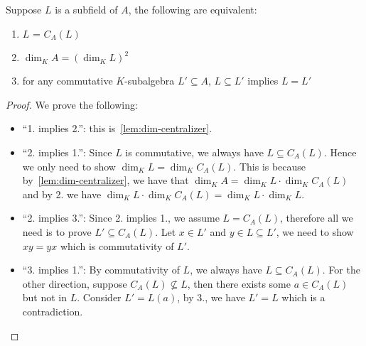 \begin{lemma}\label{lem:tfae-subfield}
  Suppose $L$ is a subfield of $A$, the following are equivalent:
  \begin{enumerate}
    \item $L$ = $C_{A}(L)$
    \item $\dim_{K}A = {\left(\dim_{K}L\right)}^{2}$
    \item for any commutative $K$-subalgebra $L' \subseteq A$, $L \subseteq L'$ implies $L = L'$
  \end{enumerate}
  \leanok
\end{lemma}
\begin{proof}
  We prove the following:
  \begin{itemize}
    \item ``1. implies 2.'': this is~\cref{lem:dim-centralizer}.
    \item ``2. implies 1.'': Since $L$ is commutative, we always have $L \subseteq C_{A}(L)$. Hence we only need to show $\dim_{K}L = \dim_{K}C_{A}(L)$. This is because by~\cref{lem:dim-centralizer}, we have that $\dim_{K}A = \dim_{K}L\cdot \dim_{K}C_{A}(L)$ and by 2. we have $\dim_{K}L\cdot \dim_{K}C_{A}(L)= \dim_{K}L\cdot \dim_{K}L$.
    \item ``2. implies 3.'': Since 2. implies 1., we assume $L = C_{A}(L)$, therefore all we need is to prove $L' \subseteq C_{A}(L)$. Let $x \in L'$ and $y \in L \subseteq L'$, we need to show $xy = yx$ which is commutativity of $L'$.
    \item ``3. implies 1.'': By commutativity of $L$, we always have $L \subseteq C_{A}(L)$. For the other direction, suppose $C_{A}(L)\not\subseteq L$, then there exists some $a \in C_{A}(L)$ but not in $L$. Consider $L' = L(a)$, by 3., we have $L' = L$ which is a contradiction.
  \end{itemize}
\end{proof}

